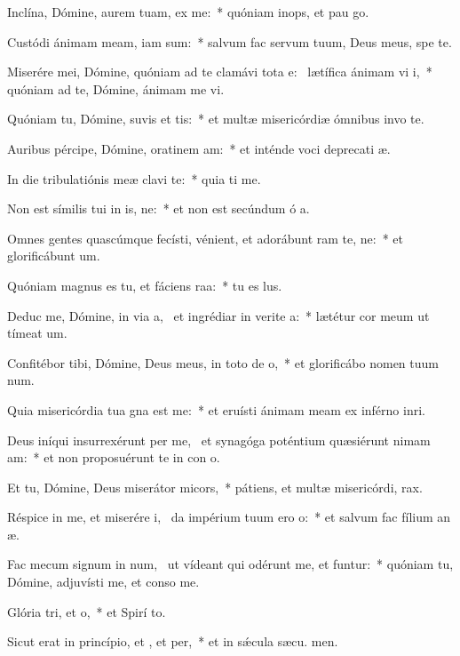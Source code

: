 \item Inclína, Dómine, aurem tuam,  ex me:~* quóniam inops, et pau  go.
\item Custódi ánimam meam, iam  sum:~* salvum fac servum tuum, Deus meus, spe  te.
\item Miserére mei, Dómine, quóniam ad te clamávi tota e:~\pscross{} lætífica ánimam vi i,~* quóniam ad te, Dómine, ánimam me vi.
\item Quóniam tu, Dómine, suvis et tis:~* et multæ misericórdiæ ómnibus invo te.
\item Auribus pércipe, Dómine, oratinem am:~* et inténde voci deprecati æ.
\item In die tribulatiónis meæ clavi  te:~* quia ti me.
\item Non est símilis tui in is, ne:~* et non est secúndum ó a.
\item Omnes gentes quascúmque fecísti, vénient, et adorábunt ram te, ne:~* et glorificábunt  um.
\item Quóniam magnus es tu, et fáciens raa:~* tu es  lus.
\item Deduc me, Dómine, in via a,~\pscross{} et ingrédiar in verite a:~* lætétur cor meum ut tímeat  um.
\item Confitébor tibi, Dómine, Deus meus, in toto de o,~* et glorificábo nomen tuum  num.
\item Quia misericórdia tua gna est  me:~* et eruísti ánimam meam ex inférno inri.
\item Deus iníqui insurrexérunt per me,~\pscross{} et synagóga poténtium quæsiérunt nimam am:~* et non proposuérunt te in con o.
\item Et tu, Dómine, Deus miserátor  micors,~* pátiens, et multæ misericórdi,  rax.
\item Réspice in me, et miserére i,~\pscross{} da impérium tuum ero o:~* et salvum fac fílium an æ.
\item Fac mecum signum in num,~\pscross{} ut vídeant qui odérunt me, et funtur:~* quóniam tu, Dómine, adjuvísti me, et conso  me.
\item Glória tri, et o,~* et Spirí to.
\item Sicut erat in princípio, et , et per,~* et in sǽcula sæcu. men.
